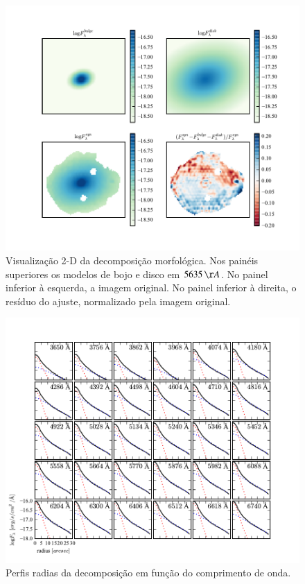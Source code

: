 \begin{figure}
	\includegraphics{figuras/decomp-model-images}
	\caption[Visualização 2-D da decomposição morfológica] {Visualização 2-D da
	decomposição morfológica. Nos painéis superiores os modelos de bojo e disco em
	$5635\,\AA$. No painel inferior à esquerda, a imagem original. No painel
	inferior à direita, o resíduo do ajuste, normalizado pela imagem original.}
	\label{fig:decompImages}
\end{figure}

\begin{figure}
	\includegraphics{figuras/decomp-radial-profile}
	\caption[Perfis radias da decomposição em função do comprimento de onda]
	{Perfis radias da decomposição em função do comprimento de onda.}
	\label{fig:decompRadprof}
\end{figure}

